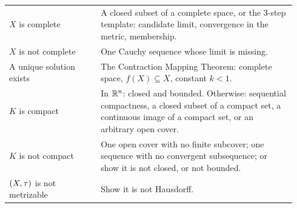 \begin{center}
\begin{longtable}{@{}p{0.3\linewidth}p{0.64\linewidth}@{}}
$X$ is complete & A closed subset of a complete space, or the 3-step template: candidate limit, convergence in the metric, membership.\\
$X$ is not complete & One Cauchy sequence whose limit is missing.\\
A unique solution exists & The Contraction Mapping Theorem: complete space, $f(X)\subseteq X$, constant $k<1$.\\
$K$ is compact & In $\mathbb{R}^n$: closed and bounded. Otherwise: sequential compactness, a closed subset of a compact set, a continuous image of a compact set, or an arbitrary open cover.\\
$K$ is not compact & One open cover with no finite subcover; one sequence with no convergent subsequence; or show it is not closed, or not bounded.\\
$(X,\tau)$ is not metrizable & Show it is not Hausdorff.\\
\bottomrule
\end{longtable}
\end{center}

